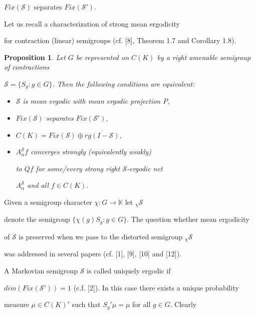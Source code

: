 \documentclass{amsart}
\newtheorem{prop}[thm]{Proposition}
\theoremstyle{definition}
\theoremstyle{remark}
\numberwithin{equation}{section}
\begin{document}
$Fix(\mathcal{S})$ separates $Fix(\mathcal{S}')$.

Let us recall a characterization of strong mean ergodicity

for contraction (linear) semigroups (cf. [8], Theorem 1.7 and Corollary 1.8).

\begin{prop}

Let $G$ be represented on $C(K)$ by a right amenable semigroup of contractions

$\mathcal{S} = \{ S_g : g \in G \}$. Then the following conditions are equivalent:

\begin{itemize}

\item[(1)] $\mathcal{S}$ is mean ergodic with mean ergodic projection $P$,

\item[(2)] $Fix(\mathcal{S})$ separates $Fix(\mathcal{S}')$,

\item[(3)] $C(K) = Fix(\mathcal{S})\oplus \overline{rg(I - \mathcal{S})} $,

\item[(4)] $A_{\alpha}^{\mathcal{S}}f$ converges strongly (equivalently weakly)

to $Qf$ for some/every strong right $\mathcal{S}$-ergodic net

$A_{\alpha}^{\mathcal{S}}$ and all $f\in C(K)$.

\end{itemize}

\end{prop}



Given a semigroup character $\chi : G \to \mathbb{K} $ let $_{\chi}\mathcal{S}$

denote the semigroup $\{ \chi(g)S_g : g\in G\}$. The question whether mean ergodicity

of $\mathcal{S}$ is preserved when we pass to the distorted semigroup $_{\chi}\mathcal{S}$

was addressed in several papers (cf. [1], [9], [10] and [12]).



A Markovian semigroup $\mathcal{S}$ is called uniquely ergodic if

$dim(Fix(\mathcal{S}')) = 1$ (c.f. [2]). In this case there exists a unique probability

measure $\mu \in C(K)'$ such that $S_g'\mu = \mu $ for all $g\in G$. Clearly
\end{document}
